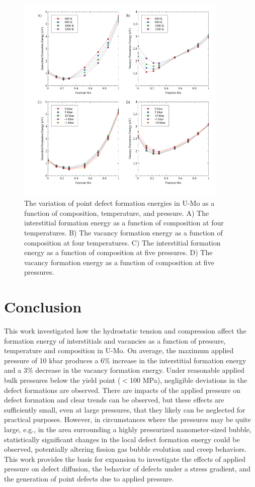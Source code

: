 \documentclass[default]{sn-jnl}%
\begin{document}
\begin{figure}[htbp]
\begin{center}
\includegraphics[width=0.9\textwidth]{figA.pdf} 
\caption{The variation of point defect formation energies in U-Mo as a function of composition, temperature, and pressure. A) The interstitial formation energy as a function of composition at four temperatures. B) The vacancy formation energy as a function of composition at four temperatures. C) The interstitial formation energy as a function of composition at five pressures. D) The vacancy formation energy as a function of composition at five pressures. }
\label{fig:A}
\end{center}
\end{figure}

\section{Conclusion}\label{sec4}
This work investigated how the hydrostatic tension and compression affect the formation energy of interstitials and vacancies as a function of pressure, temperature and composition in U-Mo. On average, the maximum applied pressure of 10 kbar produces a 6\% increase in the interstitial formation energy and a 3\% decrease in the vacancy formation energy. Under reasonable applied bulk pressures below the yield point ($<$100 MPa), negligible deviations in the defect formations are observed. There are impacts of the applied pressure on defect formation and clear trends can be observed, but these effects are sufficiently small, even at large pressures, that they likely can be neglected for practical purposes. However, in circumstances where the pressures may be quite large, e.g., in the area surrounding a highly pressurized nanometer-sized bubble, statistically significant changes in the local defect formation energy could be observed, potentially altering fission gas bubble evolution and creep behaviors. This work provides the basis for expansion to investigate the effects of applied pressure on defect diffusion, the behavior of defects under a stress gradient, and the generation of point defects due to applied pressure. 
\end{document}
